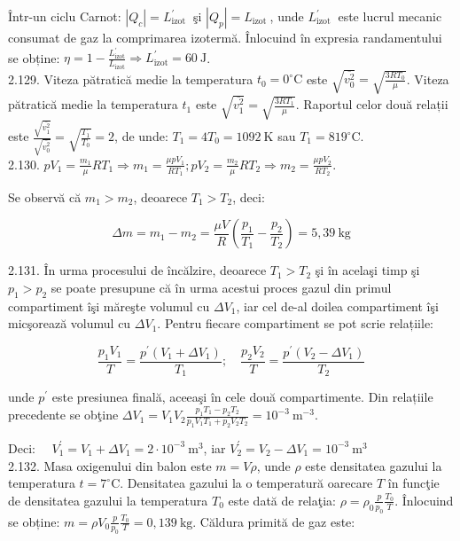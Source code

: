 \documentclass[10pt]{article}
\begin{document}
Într-un ciclu Carnot: $\left|Q_{c}\right|=L_{\text {izot }}^{\prime}$ şi $\left|Q_{p}\right|=L_{\text {izot }}$, unde $L_{\text {izot }}^{\prime}$ este lucrul mecanic consumat de gaz la comprimarea izotermă. Înlocuind în expresia randamentului se obține: $\eta=1-\frac{L_{\mathrm{izot}}^{\prime}}{L_{\mathrm{izot}}} \Rightarrow L_{\mathrm{izot}}^{\prime}=60 \mathrm{~J}$.\\
2.129. Viteza pătratică medie la temperatura $t_{0}=0^{\circ} \mathrm{C}$ este $\sqrt{\overline{v_{0}^{2}}}=\sqrt{\frac{3 R T_{0}}{\mu}}$. Viteza pătratică medie la temperatura $t_{1}$ este $\sqrt{\overline{v_{1}^{2}}}=\sqrt{\frac{3 R T_{1}}{\mu}}$. Raportul celor două relații este $\frac{\sqrt{\overline{v_{1}^{2}}}}{\sqrt{\overline{v_{0}^{2}}}}=\sqrt{\frac{T_{1}}{T_{0}}}=2$, de unde: $T_{1}=4 T_{0}=1092 \mathrm{~K}$ sau $T_{1}=819^{\circ} \mathrm{C}$.\\
2.130. $p V_{1}=\frac{m_{1}}{\mu} R T_{1} \Rightarrow m_{1}=\frac{\mu p V_{1}}{R T_{1}} ; p V_{2}=\frac{m_{2}}{\mu} R T_{2} \Rightarrow m_{2}=\frac{\mu p V_{2}}{R T_{2}}$.

Se observă că $m_{1}>m_{2}$, deoarece $T_{1}>T_{2}$, deci:

$$
\Delta m=m_{1}-m_{2}=\frac{\mu V}{R}\left(\frac{p_{1}}{T_{1}}-\frac{p_{2}}{T_{2}}\right)=5,39 \mathrm{~kg}
$$

2.131. În urma procesului de încălzire, deoarece $T_{1}>T_{2}$ şi în acelaşi timp şi $p_{1}>p_{2}$ se poate presupune că în urma acestui proces gazul din primul compartiment îşi măreşte volumul cu $\Delta V_{1}$, iar cel de-al doilea compartiment îşi micşorează volumul cu $\Delta V_{1}$. Pentru fiecare compartiment se pot scrie relațiile:

$$
\frac{p_{1} V_{1}}{T}=\frac{p^{\prime}\left(V_{1}+\Delta V_{1}\right)}{T_{1}} ; \quad \frac{p_{2} V_{2}}{T}=\frac{p^{\prime}\left(V_{2}-\Delta V_{1}\right)}{T_{2}}
$$

unde $p^{\prime}$ este presiunea finală, aceeaşi în cele două compartimente. Din relațiile precedente se obţine $\Delta V_{1}=V_{1} V_{2} \frac{p_{1} T_{1}-p_{2} T_{2}}{p_{1} V_{1} T_{1}+p_{2} V_{2} T_{2}}=10^{-3} \mathrm{~m}^{-3}$.

Deci: $\quad V_{1}^{\prime}=V_{1}+\Delta V_{1}=2 \cdot 10^{-3} \mathrm{~m}^{3}$, iar $V_{2}^{\prime}=V_{2}-\Delta V_{1}=10^{-3} \mathrm{~m}^{3}$\\
2.132. Masa oxigenului din balon este $m=V \rho$, unde $\rho$ este densitatea gazului la temperatura $t=7^{\circ} \mathrm{C}$. Densitatea gazului la o temperatură oarecare $T$ în funcţie de densitatea gazului la temperatura $T_{0}$ este dată de relaţia: $\rho=\rho_{0} \frac{p}{p_{0}} \frac{T_{0}}{T}$. Înlocuind se obține: $m=\rho V_{0} \frac{p}{p_{0}} \frac{T_{0}}{T}=0,139 \mathrm{~kg}$. Căldura primită de gaz este:
\end{document}

